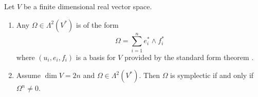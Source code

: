\begin{exercise}
	Let $V$ be a finite dimensional real vector space.
\begin{enumerate}[label = \textup{(}\alph*\textup{)}]
	\item Any $\Omega \in \Lambda^2(V^*)$ is of the form
		\begin{equation}
			\Omega = \sum_{i = 1}^n e_i^* \wedge f_i^*
		\end{equation}
		\noindent where $(u_i,e_i,f_i)$ is a basis for $V$ provided by the standard form theorem \cite[3]{dasilva:symplectic:2008}.
	\item Assume $\dim V = 2n$ and $\Omega \in \Lambda^2(V^*)$. Then $\Omega$ is symplectic if and only if $\Omega^n \neq 0$.
\end{enumerate}
\end{exercise}

